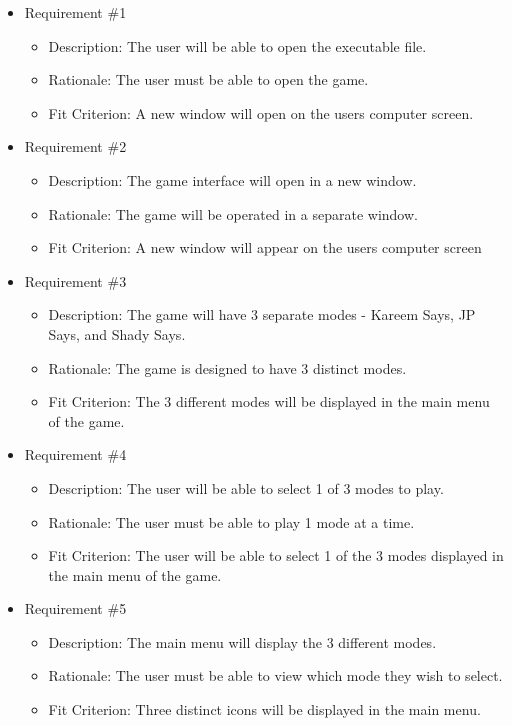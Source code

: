 \documentclass[12pt, titlepage]{article}
\begin{document}
\begin{itemize}

\item Requirement \#1
\begin{itemize}
\item Description: The user will be able to open the executable file.
\item Rationale: The user must be able to open the game.
\item Fit Criterion: A new window will open on the users computer screen.
\end{itemize}

\item Requirement \#2
\begin{itemize}
\item Description: The game interface will open in a new window.
\item Rationale: The game will be operated in a separate window. 
\item Fit Criterion: A new window will appear on the users computer screen
\end{itemize}

\item Requirement \#3
\begin{itemize}
\item Description: The game will have 3 separate modes - Kareem Says, JP Says, and Shady Says.
\item Rationale: The game is designed to have 3 distinct modes.
\item Fit Criterion: The 3 different modes will be displayed in the main menu of the game. 
\end{itemize}

\item Requirement \#4
\begin{itemize}
\item Description: The user will be able to select 1 of 3 modes to play.
\item Rationale: The user must be able to play 1 mode at a time. 
\item Fit Criterion: The user will be able to select 1 of the 3 modes displayed in the main menu of the game.
\end{itemize}

\item Requirement \#5
\begin{itemize}
\item Description: The main menu will display the 3 different modes. 
\item Rationale: The user must be able to view which mode they wish to select.
\item Fit Criterion: Three distinct icons will be displayed in the main menu.
\end{itemize}


\end{itemize}
\end{document}
